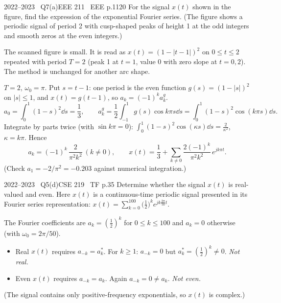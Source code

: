 \begin{qcard}{2022--2023 \textbullet\ Q7(a)}{EEE 211 \textbullet\ EEE p.11}{20}
For the signal $x(t)$ shown in the figure, find the expression of the exponential Fourier series. (The figure shows a periodic signal of period 2 with cusp-shaped peaks of height 1 at the odd integers and smooth zeros at the even integers.)
\end{qcard}
\begin{notebox}The scanned figure is small. It is read as $x(t)=(1-|t-1|)^2$ on $0\le t\le2$ repeated with period $T=2$ (peak 1 at $t=1$, value $0$ with zero slope at $t=0,2$). The method is unchanged for another arc shape.\end{notebox}
\begin{solution}
$T=2$, $\omega_0=\pi$. Put $s=t-1$: one period is the even function $g(s)=(1-|s|)^2$ on $|s|\le1$, and $x(t)=g(t-1)$, so $a_k=(-1)^ka_k^{g}$.
\[
a_0=\int_0^1(1-s)^2\dd s=\frac13,\qquad a_k^{g}=\frac12\int_{-1}^{1}g(s)\cos k\pi s\dd s=\int_0^1(1-s)^2\cos(k\pi s)\dd s .
\]
Integrate by parts twice (with $\sin k\pi=0$): $\displaystyle\int_0^1(1-s)^2\cos(\kappa s)\dd s=\frac2{\kappa^2}$, $\kappa=k\pi$. Hence
\[
a_k=(-1)^k\,\frac{2}{\pi^2k^2}\ (k\ne0),\qquad x(t)=\frac13+\sum_{k\ne0}\frac{2(-1)^k}{\pi^2k^2}\,e^{jk\pi t}.
\]
(Check $a_1=-2/\pi^2=-0.203$ against numerical integration.)
\end{solution}

\begin{qcard}{2022--2023 \textbullet\ Q5(d)}{CSE 219 \textbullet\ TF p.3}{5}
Determine whether the signal $x(t)$ is real-valued and even. Here $x(t)$ is a continuous-time periodic signal presented in its Fourier series representation: $x(t)=\displaystyle\sum_{k=0}^{100}\Big(\frac12\Big)^ke^{jk\frac{2\pi}{50}t}$.
\end{qcard}
\begin{solution}
The Fourier coefficients are $a_k=(\frac12)^k$ for $0\le k\le100$ and $a_k=0$ otherwise (with $\omega_0=2\pi/50$).
\begin{itemize}[leftmargin=1.4em,itemsep=2pt]
\item Real $x(t)$ requires $a_{-k}=a_k^*$. For $k\ge1$: $a_{-k}=0$ but $a_k^*=(\frac12)^k\ne0$. \emph{Not real.}
\item Even $x(t)$ requires $a_{-k}=a_k$. Again $a_{-k}=0\ne a_k$. \emph{Not even.}
\end{itemize}
(The signal contains only positive-frequency exponentials, so $x(t)$ is complex.)
\end{solution}

